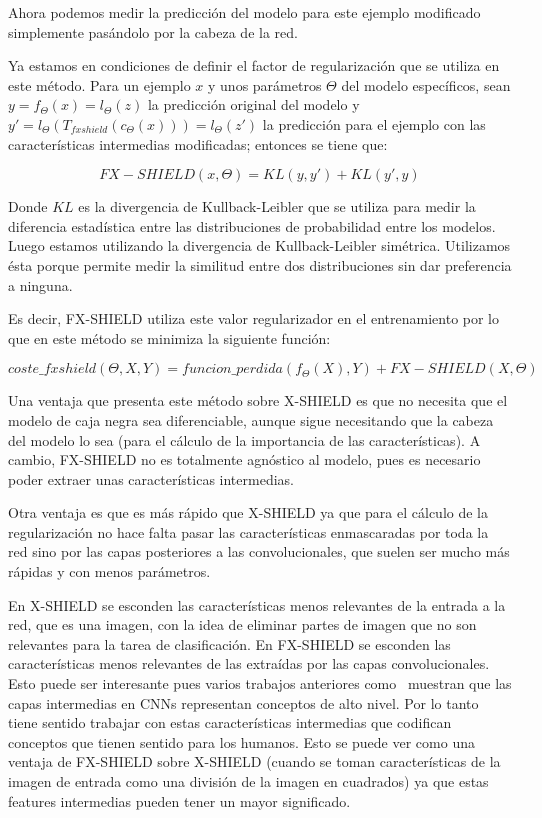 Ahora podemos medir la predicción del modelo para este ejemplo modificado simplemente pasándolo por la cabeza de la red. 

Ya estamos en condiciones de definir el factor de regularización que se utiliza en este método. Para un ejemplo $x$ y unos parámetros $\Theta$ del modelo específicos, sean $y=f_\Theta(x)=l_\Theta(z)$ la predicción original del modelo y $y'=l_\Theta(T_{fxshield}(c_\Theta(x))) = l_\Theta(z')$ la predicción para el ejemplo con las características intermedias modificadas; entonces se tiene que:

\begin{equation}
FX-SHIELD(x,\Theta) = KL(y,y') + KL(y',y)
\end{equation}

Donde $KL$ es la divergencia de Kullback-Leibler que se utiliza para medir la diferencia estadística entre las distribuciones de probabilidad entre los modelos. Luego estamos utilizando la divergencia de Kullback-Leibler simétrica. Utilizamos ésta porque permite medir la similitud entre dos distribuciones sin dar preferencia a ninguna.

Es decir, FX-SHIELD utiliza este valor regularizador en el entrenamiento por lo que en este método se minimiza la siguiente función:

\begin{equation}
coste\_fxshield(\Theta,X,Y) = funcion\_perdida(f_\Theta(X),Y) + FX-SHIELD(X,\Theta)
\end{equation}


Una ventaja que presenta este método sobre X-SHIELD es que no necesita que el modelo de caja negra sea diferenciable, aunque sigue necesitando que la cabeza del modelo lo sea (para el cálculo de la importancia de las características). A cambio, FX-SHIELD no es totalmente agnóstico al modelo, pues es necesario poder extraer unas características intermedias.

Otra ventaja es que es más rápido que X-SHIELD ya que para el cálculo de la regularización no hace falta pasar las características enmascaradas por toda la red sino por las capas posteriores a las convolucionales, que suelen ser mucho más rápidas y con menos parámetros.

En X-SHIELD se esconden las características menos relevantes de la entrada a la red, que es una imagen, con la idea de eliminar partes de imagen que no son relevantes para la tarea de clasificación. En FX-SHIELD se esconden las características menos relevantes de las extraídas por las capas convolucionales. Esto puede ser interesante pues varios trabajos anteriores como~\cite{NetDiss,tcav} muestran que las capas intermedias en CNNs representan conceptos de alto nivel. Por lo tanto tiene sentido trabajar con estas características intermedias que codifican conceptos que tienen sentido para los humanos. Esto se puede ver como una ventaja de FX-SHIELD sobre X-SHIELD (cuando se toman características de la imagen de entrada como una división de la imagen en cuadrados) ya que estas features intermedias pueden tener un mayor significado.

